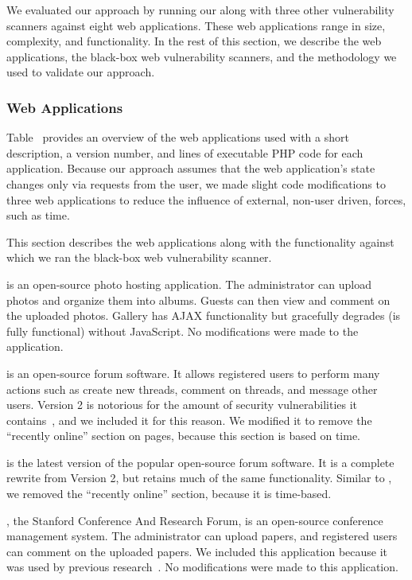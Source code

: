 We evaluated our approach by running our \crawler{} along with three
other vulnerability scanners against eight web applications. These web
applications range in size, complexity, and functionality. In the rest of this
section, we describe the web applications, the black-box web vulnerability
scanners, and the methodology we used to validate our approach.

\subsubsection{Web Applications}

Table~ provides an overview of the web applications used with
a short description, a version number, and lines of executable PHP code for each
application. Because our approach assumes that the web application's state
changes only via requests from the user, we made slight code modifications to three
web applications to reduce the influence of external, non-user driven, forces,
such as time. 

This section describes the web applications along with the functionality
against which we ran the black-box web vulnerability scanner.

\noindent \textbf{\gallery{}} is an open-source photo hosting application. The
administrator can upload photos and organize them into albums. Guests can then
view and comment on the uploaded photos. Gallery has AJAX functionality but
gracefully degrades (is fully functional) without JavaScript. No modifications
were made to the application.

\noindent \textbf{\phpbbtwo{}} is an open-source forum software. It allows
registered users to perform many actions such as create new threads, comment on
threads, and message other users. Version 2 is notorious for the amount of
security vulnerabilities it contains~\cite{bau10:state}, and we
included it for this reason. We modified it to remove the ``recently online''
section on pages, because this section is based on time.

\noindent \textbf{\phpbbthree{}} is the latest version of the popular
open-source forum software. It is a complete rewrite from Version 2, but
retains much of the same functionality. Similar to \phpbbtwo{}, we removed the
``recently online'' section, because it is time-based.

\noindent \textbf{\scarf{}}, the Stanford Conference And Research Forum, is an
open-source conference management system. The administrator can upload papers,
and registered users can comment on the uploaded papers. We included this
application because it was used by previous
research~\cite{li11:BLOCK,balzarotti07:mimosa,cova07:swaddler,li12:sentinel}. No modifications were made to
this application.

